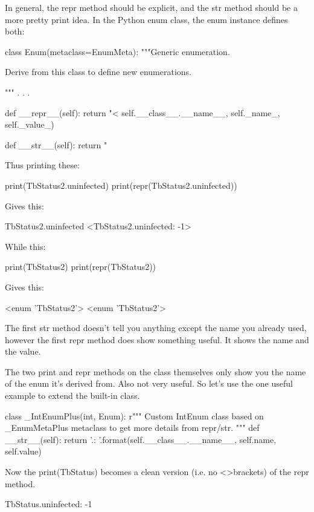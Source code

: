 \documentclass[12pt]{article}
\begin{document}
In general, the repr method should be explicit, and the str method should be a more pretty print idea.  In the Python enum class, the enum instance defines both:

\begin{Python}
class Enum(metaclass=EnumMeta):
    """Generic enumeration.

    Derive from this class to define new enumerations.

    """
. . .

    def __repr__(self):
        return "<%
                self.__class__.__name__, self._name_, self._value_)

    def __str__(self):
        return "%
\end{Python}

Thus printing these:
\begin{Python}
    print(TbStatus2.uninfected)
    print(repr(TbStatus2.uninfected))
\end{Python}
Gives this:
\begin{Python}
TbStatus2.uninfected
<TbStatus2.uninfected: -1>
\end{Python}

While this:
\begin{Python}
    print(TbStatus2)
    print(repr(TbStatus2))
\end{Python}

Gives this:
\begin{Python}
<enum 'TbStatus2'>
<enum 'TbStatus2'>
\end{Python}

The first str method doesn't tell you anything except the name you already used, however the first repr method does show something useful.  It shows the name and the value.

The two print and repr methods on the class themselves only show you the name of the enum it's derived from.  Also not very useful.  So let's use the one useful example to extend the built-in class.

\begin{Python}
class _IntEnumPlus(int, Enum):
    r"""
    Custom IntEnum class based on _EnumMetaPlus metaclass to get more details
    from repr/str.
    """
    def __str__(self):
        return '{}.{}: {}'.format(self.__class__.__name__, self.name, self.value)
\end{Python}

Now the print(TbStatus) becomes a clean version (i.e. no \textless \textgreater brackets) of the repr method.
\begin{Python}
TbStatus.uninfected: -1
\end{Python}
\end{document}
